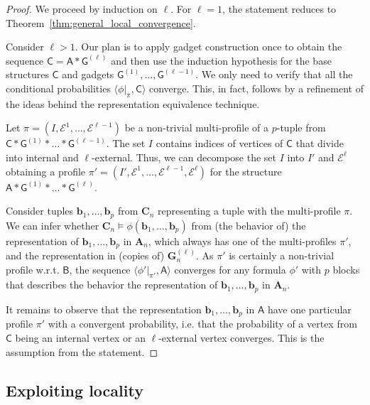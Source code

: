\documentclass[11pt]{article}
\theoremstyle{plain}
\theoremstyle{definition}
\theoremstyle{remark}
\newcommand{\stonepar}[2]{\langle #1, #2 \rangle}
\newcommand{\str}[1]{\mathbf{#1}}
\newcommand{\strseq}[1]{{\boldsymbol{\mathsf{#1}}}}
\newcommand{\tpl}[1]{{\bm{#1}}}
\begin{document}
\begin{proof}
    We proceed by induction on $\ell$.
    For $\ell = 1$, the statement reduces to Theorem~\ref{thm:general_local_convergence}.
    
    Consider $\ell > 1$.
    Our plan is to apply gadget construction once to obtain the sequence $\strseq{C} = \strseq{A}*\strseq{G}^{(\ell)}$ and then use the induction hypothesis for the base structures $\strseq{C}$ and gadgets $\strseq{G}^{(1)}, \dots, \strseq{G}^{(\ell - 1)}$.
    We only need to verify that all the conditional probabilities $\stonepar{\phi|_{\pi}}{\strseq{C}}$ converge.
    This, in fact, follows by a refinement of the ideas behind the representation equivalence technique.
    
    Let $\pi = (I, \mathcal{E}^1, \dots, \mathcal{E}^{\ell-1})$ be a non-trivial multi-profile of a $p$-tuple from $\strseq{C}*\strseq{G}^{(1)}*\dots*\strseq{G}^{(\ell-1)}$.
    The set $I$ contains indices of vertices of $\strseq{C}$ that divide into internal and $\ell$-external.
    Thus, we can decompose the set $I$ into $I'$ and $\mathcal{E}^{\ell}$ obtaining a profile $\pi' = (I', \mathcal{E}^1, \dots, \mathcal{E}^{\ell-1}, \mathcal{E}^{\ell})$ for the structure $\strseq{A}*\strseq{G}^{(1)} * \dots *\strseq{G}^{(\ell)}$.
    
    Consider tuples $\tpl{b}_1, \dots, \tpl{b}_p$ from $\str{C}_n$ representing a tuple with the multi-profile $\pi$.
    We can infer whether $\str{C}_n \models \phi(\tpl{b}_1, \dots, \tpl{b}_p)$ from (the behavior of) the representation of $\tpl{b}_1, \dots, \tpl{b}_p$ in $\str{A}_n$, which always has one of the multi-profiles $\pi'$, and the representation in (copies of) $\str{G}^{(\ell)}_n$.
    As $\pi'$ is certainly a non-trivial profile w.r.t. $\strseq{B}$, the sequence $\stonepar{\phi'|_{\pi'}}{\strseq{A}}$ converges for any formula $\phi'$ with $p$ blocks that describes the behavior the representation of $\tpl{b}_1, \dots, \tpl{b}_p$ in $\str{A}_n$.
    
    It remains to observe that the representation $\tpl{b}_1, \dots, \tpl{b}_p$ in $\strseq{A}$ have one particular profile $\pi'$ with a convergent probability, i.e. that the probability of a vertex from $\strseq{C}$ being an internal vertex or an $\ell$-external vertex converges.
    This is the assumption from the statement.
\end{proof}

\subsection{Exploiting locality}\label{ssec:exploiting_locality}
\end{document}
